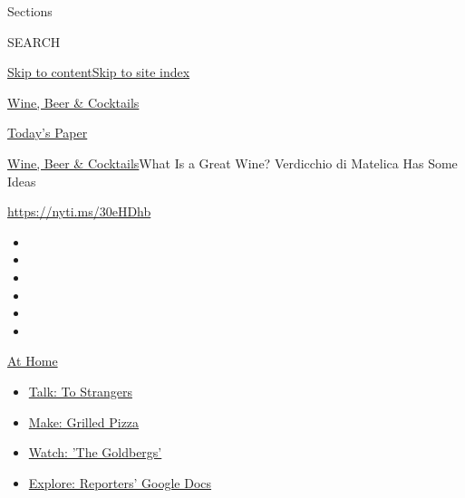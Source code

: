 Sections

SEARCH

\protect\hyperlink{site-content}{Skip to
content}\protect\hyperlink{site-index}{Skip to site index}

\href{https://www.nytimes3xbfgragh.onion/section/food/drinks}{Wine, Beer
\& Cocktails}

\href{https://myaccount.nytimes3xbfgragh.onion/auth/login?response_type=cookie\&client_id=vi}{}

\href{https://www.nytimes3xbfgragh.onion/section/todayspaper}{Today's
Paper}

\href{/section/food/drinks}{Wine, Beer \& Cocktails}\textbar{}What Is a
Great Wine? Verdicchio di Matelica Has Some Ideas

\url{https://nyti.ms/30eHDhb}

\begin{itemize}
\item
\item
\item
\item
\item
\item
\end{itemize}

\href{https://www.nytimes3xbfgragh.onion/spotlight/at-home?action=click\&pgtype=Article\&state=default\&region=TOP_BANNER\&context=at_home_menu}{At
Home}

\begin{itemize}
\tightlist
\item
  \href{https://www.nytimes3xbfgragh.onion/2020/08/03/well/family/the-benefits-of-talking-to-strangers.html?action=click\&pgtype=Article\&state=default\&region=TOP_BANNER\&context=at_home_menu}{Talk:
  To Strangers}
\item
  \href{https://www.nytimes3xbfgragh.onion/2020/08/01/at-home/coronavirus-make-pizza-on-a-grill.html?action=click\&pgtype=Article\&state=default\&region=TOP_BANNER\&context=at_home_menu}{Make:
  Grilled Pizza}
\item
  \href{https://www.nytimes3xbfgragh.onion/2020/07/31/arts/television/goldbergs-abc-stream.html?action=click\&pgtype=Article\&state=default\&region=TOP_BANNER\&context=at_home_menu}{Watch:
  'The Goldbergs'}
\item
  \href{https://www.nytimes3xbfgragh.onion/interactive/2020/at-home/even-more-reporters-editors-diaries-lists-recommendations.html?action=click\&pgtype=Article\&state=default\&region=TOP_BANNER\&context=at_home_menu}{Explore:
  Reporters' Google Docs}
\end{itemize}

